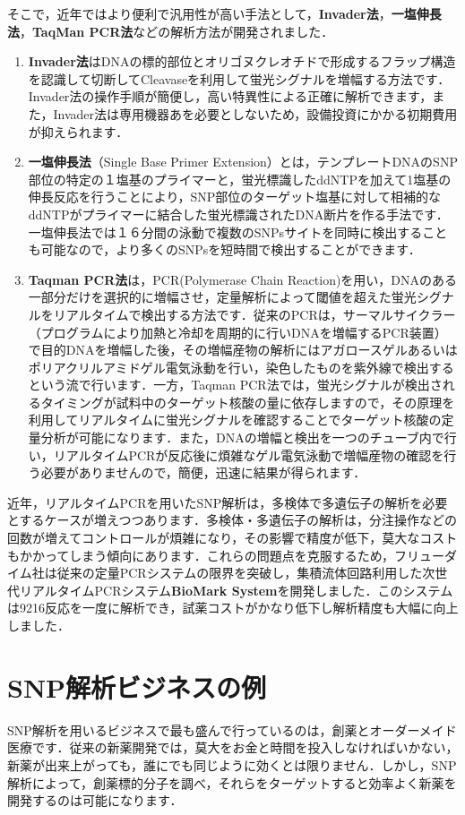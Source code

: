 \documentclass[a4paper,11pt]{jsarticle}
\numberwithin{theorem}{section}  %
\numberwithin{equation}{section} %
\begin{document}
そこで，近年ではより便利で汎用性が高い手法として，{\bf Invader法}，{\bf 一塩伸長法}，{\bf TaqMan PCR法}などの解析方法が開発されました\cite{snp}．
\begin{enumerate}
\item
{\bf Invader法}はDNAの標的部位とオリゴヌクレオチドで形成するフラップ構造を認識して切断してCleavaseを利用して蛍光シグナルを増幅する方法です．Invader法の操作手順が簡便し，高い特異性による正確に解析できます，また，Invader法は専用機器あを必要としないため，設備投資にかかる初期費用が抑えられます．

\item
{\bf 一塩伸長法}（Single Base Primer Extension）とは，テンプレートDNAのSNP部位の特定の１塩基のプライマーと，蛍光標識したddNTPを加えて1塩基の伸長反応を行うことにより，SNP部位のターゲット塩基に対して相補的なddNTPがプライマーに結合した蛍光標識されたDNA断片を作る手法です．一塩伸長法では１６分間の泳動で複数のSNPsサイトを同時に検出することも可能なので，より多くのSNPsを短時間で検出することができます．

\item
{\bf Taqman PCR法}は，PCR(Polymerase Chain Reaction)を用い，DNAのある一部分だけを選択的に増幅させ，定量解析によって閾値を超えた蛍光シグナルをリアルタイムで検出する方法です．従来のPCRは，サーマルサイクラー（プログラムにより加熱と冷却を周期的に行いDNAを増幅するPCR装置）で目的DNAを増幅した後，その増幅産物の解析にはアガロースゲルあるいはポリアクリルアミドゲル電気泳動を行い，染色したものを紫外線で検出するという流で行います．一方，Taqman PCR法では，蛍光シグナルが検出されるタイミングが試料中のターゲット核酸の量に依存しますので，その原理を利用してリアルタイムに蛍光シグナルを確認することでターゲット核酸の定量分析が可能になります．また，DNAの増幅と検出を一つのチューブ内で行い，リアルタイムPCRが反応後に煩雑なゲル電気泳動で増幅産物の確認を行う必要がありませんので，簡便，迅速に結果が得られます\cite{realtime pcr}．
\end{enumerate}

近年，リアルタイムPCRを用いたSNP解析は，多検体で多遺伝子の解析を必要とするケースが増えつつあります．多検体・多遺伝子の解析は，分注操作などの回数が増えてコントロールが煩雑になり，その影響で精度が低下，莫大なコストもかかってしまう傾向にあります．これらの問題点を克服するため，フリューダイム社は従来の定量PCRシステムの限界を突破し，集積流体回路利用した次世代リアルタイムPCRシステム{\bf BioMark System}を開発しました．このシステムは9216反応を一度に解析でき，試薬コストがかなり低下し解析精度も大幅に向上しました．

\section{SNP解析ビジネスの例}
SNP解析を用いるビジネスで最も盛んで行っているのは，創薬とオーダーメイド医療です．従来の新薬開発では，莫大をお金と時間を投入しなければいかない，新薬が出来上がっても，誰にでも同じように効くとは限りません．しかし，SNP解析によって，創薬標的分子を調べ，それらをターゲットすると効率よく新薬を開発するのは可能になります．
\end{document}
